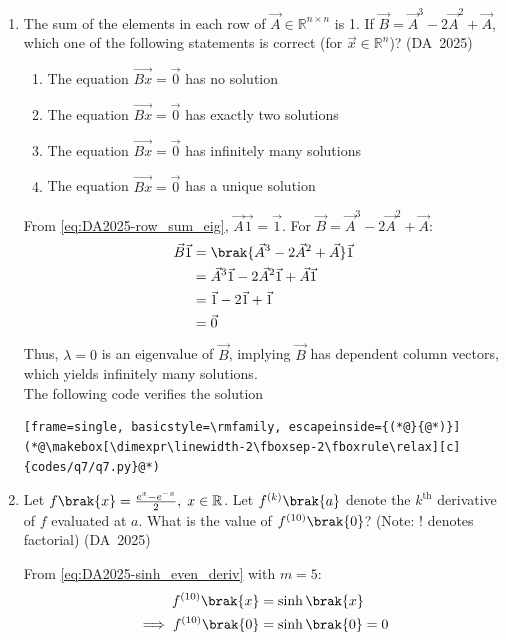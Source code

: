 \begin{enumerate}[label=\thesubsection.\arabic*, ref=\thesubsection.\theenumi]
	\item 
	The sum of the elements in each row of $\vec{A} \in \mathbb{R}^{n \times n}$ is 1. If $\vec{B} = \vec{A}^3 - 2\vec{A}^2 + \vec{A}$, which one of the following statements is correct (for $\vec{x} \in \mathbb{R}^n$)?
	\hfill (DA~2025)
	\begin{enumerate}
		\item The equation $\vec{Bx} = \vec{0}$ has no solution
		\item The equation $\vec{Bx} = \vec{0}$ has exactly two solutions
		\item The equation $\vec{Bx} = \vec{0}$ has infinitely many solutions
		\item The equation $\vec{Bx} = \vec{0}$ has a unique solution
	\end{enumerate}
	\solution
	From \eqref{eq:DA2025-row_sum_eig}, $\vec{A}\vec{1} = \vec{1}$. For $\vec{B} = \vec{A}^3 - 2\vec{A}^2 + \vec{A}$:
	\begin{align}
		\vec{B}\vec{1} &= \brak{\vec{A}^3 - 2\vec{A}^2 + \vec{A}}\vec{1}
		\\
		&= \vec{A}^3\vec{1} - 2\vec{A}^2\vec{1} + \vec{A}\vec{1}
		\\
		&= \vec{1} - 2\vec{1} + \vec{1}
		\\
		&= \vec{0}
	\end{align}
	Thus, $\lambda = 0$ is an eigenvalue of $\vec{B}$, implying $\vec{B}$ has dependent column vectors, which yields infinitely many solutions.
	\\
	The following code verifies the solution
	\begin{lstlisting}[frame=single, basicstyle=\rmfamily, escapeinside={(*@}{@*)}]
(*@\makebox[\dimexpr\linewidth-2\fboxsep-2\fboxrule\relax][c]{codes/q7/q7.py}@*)
	\end{lstlisting}
\item 
Let $f\brak{x} = \frac{e^x - e^{-x}}{2}, \; x \in \mathbb{R}$. Let $f^{(k)}\brak{a}$ denote the $k^{\text{th}}$ derivative of $f$ evaluated at $a$. What is the value of $f^{(10)}\brak{0}$? (Note: ! denotes factorial)
\hfill (DA~2025)
\begin{enumerate}
	\begin{multicols}{4}
		\item $0$
		\item $1$
		\item $\frac{1}{10!}$
		\item $\frac{2}{10!}$
	\end{multicols}
\end{enumerate}
\solution
From \eqref{eq:DA2025-sinh_even_deriv} with $m = 5$:
\begin{align}
	f^{(10)}\brak{x} &= \sinh\brak{x}
	\\
	\implies f^{(10)}\brak{0} &= \sinh\brak{0} = 0
\end{align}


\end{enumerate}
